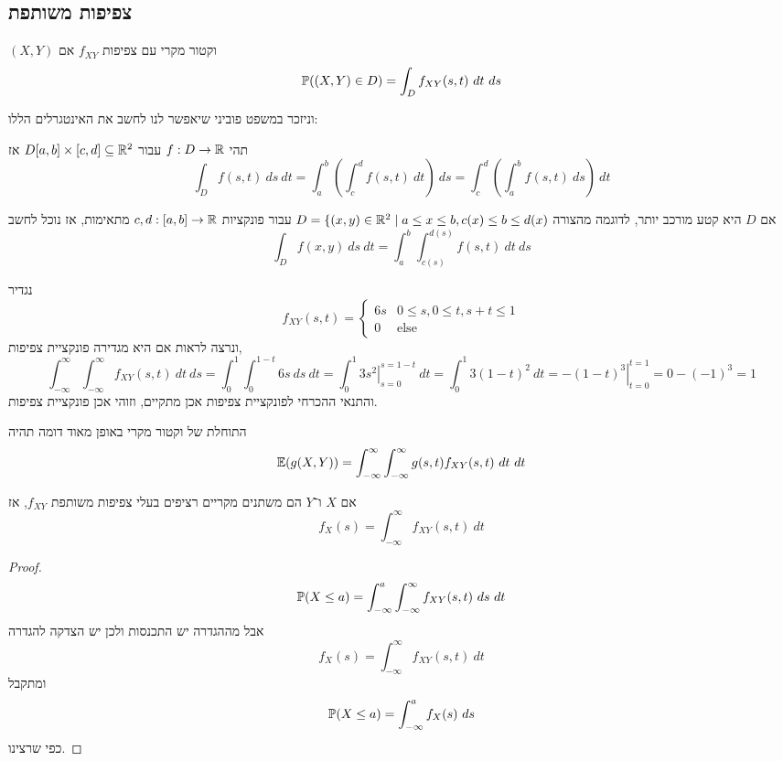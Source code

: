 \subsection{צפיפות משותפת}
\begin{definition}
	$(X, Y)$ וקטור מקרי עם צפיפות $f_{X Y}$ אם
	\[
		\mathbb{P}((X, Y) \in D)
		= \int_D f_{X Y}(s, t)\ dt\ ds
	\]
\end{definition}
וניזכר במשפט פוביני שיאפשר לנו לחשב את האינטגרלים הללו:
\begin{theorem}
	תהי $f : D \to \mathbb{R}$ עבור $D [a, b] \times [c, d] \subseteq \mathbb{R}^2$ אז
	\[
		\int_D f(s, t)\ ds\ dt
		= \int_a^b \left( \int_c^d f(s, t)\ dt \right)\ ds
		= \int_c^d \left( \int_a^b f(s, t)\ ds \right)\ dt
	\]
\end{theorem}
אם $D$ היא קטע מורכב יותר, לדוגמה מהצורה $D = \{ (x, y) \in \mathbb{R}^2 \mid a \le x \le b, c(x) \le b \le d(x)$ עבור פונקציות $c, d : [a, b] \to \mathbb{R}$ מתאימות, אז נוכל לחשב
\[
	\int_D f(x, y)\ ds\ dt
	= \int_a^b \int_{c(s)}^{d(s)} f(s, t)\ dt\ ds
\]
\begin{example}
	נגדיר
	\[
		f_{X Y}(s, t)
		= \begin{cases}
			6s & 0 \le s, 0 \le t, s + t \le 1 \\
			0 & \text{else}
		\end{cases}
	\]
	ונרצה לראות אם היא מגדירה פונקציית צפיפות,
	\[
		\int_{-\infty}^{\infty} \int_{-\infty}^{\infty} f_{X Y}(s, t)\ dt\ ds
		= \int_0^1 \int_0^{1 - t} 6s\ ds\ dt
		= \int_0^1 \left. 3s^2 \right\rvert_{s = 0}^{s = 1 - t}\ dt
		= \int_0^1 3{(1 - t)}^2\ dt
		= \left. - {(1 - t)}^3 \right\rvert_{t = 0}^{t = 1}
		= 0 - {(-1)}^3
		= 1
	\]
	והתנאי ההכרחי לפונקציית צפיפות אכן מתקיים, וזוהי אכן פונקציית צפיפות.
\end{example}
\begin{remark}
	התוחלת של וקטור מקרי באופן מאוד דומה תהיה
	\[
		\mathbb{E}(g(X, Y))
		= \int_{-\infty}^{\infty} \int_{-\infty}^{\infty} g(s, t) f_{X Y}(s, t)\ dt\ dt
	\]
\end{remark}
\begin{proposition}
	אם $X$ ו־$Y$ הם משתנים מקריים רציפים בעלי צפיפות משותפת $f_{X Y}$, אז
	\[
		f_X(s)
		= \int_{-\infty}^{\infty} f_{X Y}(s, t)\ dt
	\]
\end{proposition}
\begin{proof}
	\[
		\PP(X \le a)
		= \int_{-\infty}^a \int_{-\infty}^{\infty} f_{X Y}(s, t)\ ds\ dt
	\]
	אבל מההגדרה יש התכנסות ולכן יש הצדקה להגדרה
	\[
		f_X(s)
		= \int_{-\infty}^{\infty} f_{X Y}(s, t)\ dt
	\]
	ומתקבל
	\[
		\mathbb{P}(X \le a)
		= \int_{-\infty}^a f_X(s)\ ds
	\]
	כפי שרצינו.
\end{proof}
